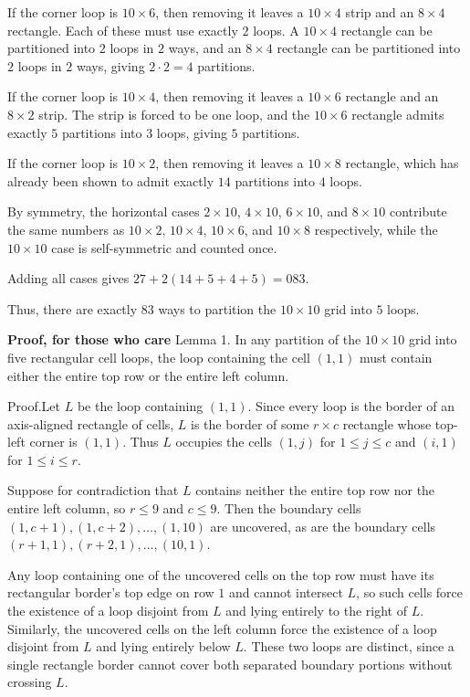 \begin{enumerate}
 If the corner loop is $10\times6$, then removing it leaves a $10\times4$ strip and an $8\times4$ rectangle. Each of these must use exactly $2$ loops. A $10\times4$ rectangle can be partitioned into $2$ loops in $2$ ways, and an $8\times4$ rectangle can be partitioned into $2$ loops in $2$ ways, giving $2\cdot2=4$ partitions.

 If the corner loop is $10\times4$, then removing it leaves a $10\times6$ rectangle and an $8\times2$ strip. The strip is forced to be one loop, and the $10\times6$ rectangle admits exactly $5$ partitions into $3$ loops, giving $5$ partitions.

 If the corner loop is $10\times2$, then removing it leaves a $10\times8$ rectangle, which has already been shown to admit exactly $14$ partitions into $4$ loops.

 By symmetry, the horizontal cases $2\times10$, $4\times10$, $6\times10$, and $8\times10$ contribute the same numbers as $10\times2$, $10\times4$, $10\times6$, and $10\times8$ respectively, while the $10\times10$ case is self-symmetric and counted once.

 Adding all cases gives $27+2(14+5+4+5)=\boxed{083}.$

 Thus, there are exactly $83$ ways to partition the $10\times10$ grid into $5$ loops.

 \textbf{Proof, for those who care} Lemma 1. In any partition of the $10\times10$ grid into five rectangular cell loops, the loop containing the cell $(1,1)$ must contain either the entire top row or the entire left column.

 Proof.Let $L$ be the loop containing $(1,1)$. Since every loop is the border of an axis-aligned rectangle of cells, $L$ is the border of some $r\times c$ rectangle whose top-left corner is $(1,1)$. Thus $L$ occupies the cells $(1,j)$ for $1\le j\le c$ and $(i,1)$ for $1\le i\le r$.

 Suppose for contradiction that $L$ contains neither the entire top row nor the entire left column, so $r\le9$ and $c\le9$. Then the boundary cells $(1,c+1),(1,c+2),\dots,(1,10)$ are uncovered, as are the boundary cells $(r+1,1),(r+2,1),\dots,(10,1)$.

 Any loop containing one of the uncovered cells on the top row must have its rectangular border’s top edge on row $1$ and cannot intersect $L$, so such cells force the existence of a loop disjoint from $L$ and lying entirely to the right of $L$. Similarly, the uncovered cells on the left column force the existence of a loop disjoint from $L$ and lying entirely below $L$. These two loops are distinct, since a single rectangle border cannot cover both separated boundary portions without crossing $L$.


\end{enumerate}
